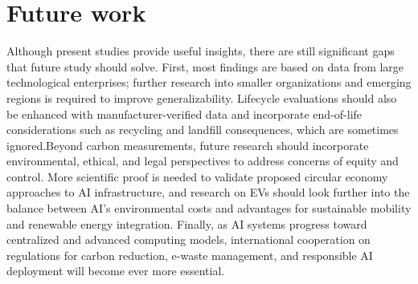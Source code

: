 \documentclass[a4paper, 12pt]{article}
\begin{document}
\section{Future work}
Although present studies provide useful insights, there are still significant gaps that future study should solve.  First, most findings are based on data from large technological enterprises; further research into smaller organizations and emerging regions is required to improve generalizability.  Lifecycle evaluations should also be enhanced with manufacturer-verified data and incorporate end-of-life considerations such as recycling and landfill consequences, which are sometimes ignored.Beyond carbon measurements, future research should incorporate environmental, ethical, and legal perspectives to address concerns of equity and control.  More scientific proof is needed to validate proposed circular economy approaches to AI infrastructure, and research on EVs should look further into the balance between AI's environmental costs and advantages for sustainable mobility and renewable energy integration.  Finally, as AI systems progress toward centralized and advanced computing models, international cooperation on regulations for carbon reduction, e-waste management, and responsible AI deployment will become ever more essential.

\printbibliography
\end{document}
